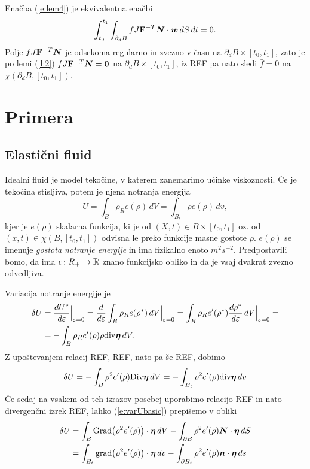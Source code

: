 \proof
	Enačba (\ref{e:lem4}) je ekvivalentna enačbi
	\[ \int_{t_0}^{t_1}\int_{\partial_d B}fJ\mathbf F^{-T}\boldsymbol N\cdot\boldsymbol w\,dS\,dt=0. \]
	Polje $fJ\mathbf F^{-T}\boldsymbol N$ je odsekoma regularno in zvezno v času na $\partial_d B\times[t_0,t_1]$,
	zato je po lemi (\ref{l:2}) $fJ\mathbf F^{-T}\boldsymbol N=\boldsymbol 0$ na $\partial_d B\times[t_0,t_1]$,
	iz REF pa nato sledi $\bar{f}=0$ na $\chi(\partial_d B, [t_0,t_1])$.
\endproof


\section{Primera}


\subsection{Elastični fluid}


Idealni fluid je model tekočine, v katerem zanemarimo učinke viskoznosti. Če je tekočina
stisljiva, potem je njena notranja energija
\[ U=\int_{B}\rho_R e(\rho)\,dV=\int_{B_t}\rho e(\rho)\,dv, \]
kjer je $e(\rho)$ skalarna funkcija, ki je od $(X,t)\in B\times[t_0,t_1]$ oz. od
$(x,t)\in\chi(B,[t_0,t_1])$ odvisna le preko funkcije masne gostote $\rho$. $e(\rho)$
se imenuje \emph{gostota notranje energije} in ima fizikalno enoto $m^2s^{-2}$.
Predpostavili bomo, da ima $e\colon R_+\to\mathbb R$ znano funkcijsko obliko in da je
vsaj dvakrat zvezno odvedljiva.

Variacija notranje energije je
\begin{align*} 
	\delta U &=\frac{dU^*}{d\varepsilon}\Big|_{\varepsilon=0}=\frac{d}{d\varepsilon}
	\int_{B}\rho_R e(\rho^*)\,dV \Big|_{\varepsilon=0} =
	\int_{B}\rho_R e'(\rho^*)\frac{d\rho^*}{d\varepsilon}\,dV \Big|_{\varepsilon=0} = \\
	&= -\int_{B}\rho_R e'(\rho)\rho\mathrm{div}\boldsymbol \eta\,dV.
\end{align*}
Z upoštevanjem relacij REF, REF, nato pa še REF, dobimo
\begin{equation}\label{e:varUbasic}
	\delta U = -\int_{B}\rho^2e'(\rho)\mathrm {Div}\boldsymbol \eta\,dV = -\int_{B_t}\rho^2 e'(\rho)\mathrm{div}\boldsymbol \eta\,dv
\end{equation}
Če sedaj na vsakem od teh izrazov posebej uporabimo relacijo REF in nato divergenčni izrek REF,
lahko (\ref{e:varUbasic}) prepišemo v obliki
\begin{align*}
	\delta U &= \int_{B}\mathrm{Grad}\big(\rho^2 e'(\rho)\big)\cdot\boldsymbol \eta\,dV
	-\int_{\partial B}\rho^2 e'(\rho)\boldsymbol N\cdot\boldsymbol \eta\,dS \\
	&= \int_{B_t}\mathrm{grad}\big(\rho^2 e'(\rho)\big)\cdot\boldsymbol \eta\,dv
	-\int_{\partial B_t}\rho^2 e'(\rho)\boldsymbol n\cdot\boldsymbol \eta\,ds
\end{align*}

